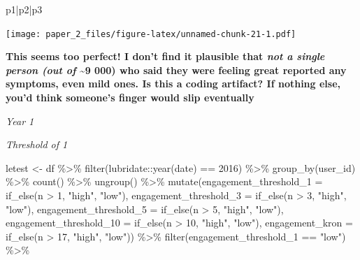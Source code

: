 \documentclass[
]{article}
\newenvironment{Shaded}{\begin{snugshade}}{\end{snugshade}}
\newcommand{\AttributeTok}[1]{\textcolor[rgb]{0.77,0.63,0.00}{#1}}
\newcommand{\DecValTok}[1]{\textcolor[rgb]{0.00,0.00,0.81}{#1}}
\newcommand{\FunctionTok}[1]{\textcolor[rgb]{0.00,0.00,0.00}{#1}}
\newcommand{\NormalTok}[1]{#1}
\newcommand{\OtherTok}[1]{\textcolor[rgb]{0.56,0.35,0.01}{#1}}
\newcommand{\SpecialCharTok}[1]{\textcolor[rgb]{0.00,0.00,0.00}{#1}}
\newcommand{\StringTok}[1]{\textcolor[rgb]{0.31,0.60,0.02}{#1}}
\begin{document}
\begin{Shaded}
\begin{Highlighting}[]
\NormalTok{p1}\SpecialCharTok{|}\NormalTok{p2}\SpecialCharTok{|}\NormalTok{p3 }
\end{Highlighting}
\end{Shaded}

\texttt{[image: paper\_2\_files/figure-latex/unnamed-chunk-21-1.pdf]}

\textbf{This seems too perfect! I don't find it plausible that \emph{not
a single person (out of} \textasciitilde9 000) who said they were
feeling great reported any symptoms, even mild ones. Is this a coding
artifact? If nothing else, you'd think someone's finger would slip
eventually}

\emph{Year 1}

\emph{Threshold of 1}

\begin{Shaded}
\begin{Highlighting}[]
\NormalTok{letest }\OtherTok{\textless{}{-}}\NormalTok{  df }\SpecialCharTok{\%\textgreater{}\%}
  \FunctionTok{filter}\NormalTok{(lubridate}\SpecialCharTok{::}\FunctionTok{year}\NormalTok{(date) }\SpecialCharTok{==} \DecValTok{2016}\NormalTok{) }\SpecialCharTok{\%\textgreater{}\%}
  \FunctionTok{group\_by}\NormalTok{(user\_id) }\SpecialCharTok{\%\textgreater{}\%}
  \FunctionTok{count}\NormalTok{() }\SpecialCharTok{\%\textgreater{}\%}
  \FunctionTok{ungroup}\NormalTok{() }\SpecialCharTok{\%\textgreater{}\%} 
  \FunctionTok{mutate}\NormalTok{(}\AttributeTok{engagement\_threshold\_1 =} \FunctionTok{if\_else}\NormalTok{(n }\SpecialCharTok{\textgreater{}} \DecValTok{1}\NormalTok{, }\StringTok{"high"}\NormalTok{, }\StringTok{"low"}\NormalTok{),}
         \AttributeTok{engagement\_threshold\_3 =} \FunctionTok{if\_else}\NormalTok{(n }\SpecialCharTok{\textgreater{}} \DecValTok{3}\NormalTok{, }\StringTok{"high"}\NormalTok{, }\StringTok{"low"}\NormalTok{),}
         \AttributeTok{engagement\_threshold\_5 =} \FunctionTok{if\_else}\NormalTok{(n }\SpecialCharTok{\textgreater{}} \DecValTok{5}\NormalTok{, }\StringTok{"high"}\NormalTok{, }\StringTok{"low"}\NormalTok{),}
         \AttributeTok{engagement\_threshold\_10 =} \FunctionTok{if\_else}\NormalTok{(n }\SpecialCharTok{\textgreater{}} \DecValTok{10}\NormalTok{, }\StringTok{"high"}\NormalTok{, }\StringTok{"low"}\NormalTok{),}
         \AttributeTok{engagement\_kron =} \FunctionTok{if\_else}\NormalTok{(n }\SpecialCharTok{\textgreater{}} \DecValTok{17}\NormalTok{, }\StringTok{"high"}\NormalTok{, }\StringTok{"low"}\NormalTok{)) }\SpecialCharTok{\%\textgreater{}\%} 
  \FunctionTok{filter}\NormalTok{(engagement\_threshold\_1 }\SpecialCharTok{==} \StringTok{"low"}\NormalTok{) }\SpecialCharTok{\%\textgreater{}\%} 

\end{Highlighting}
\end{Shaded}
\end{document}
